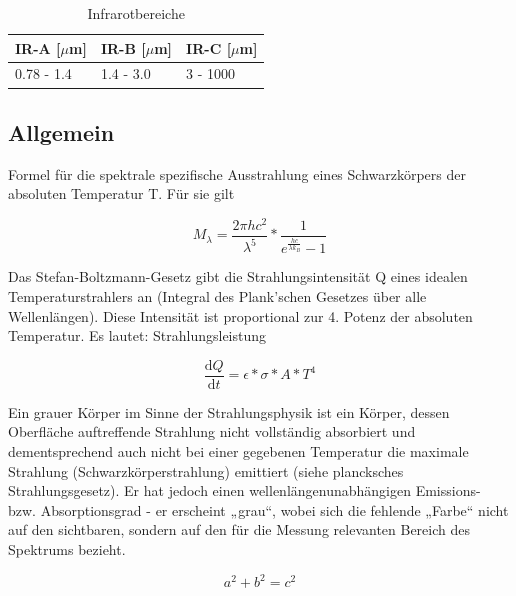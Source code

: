 \begin{table}[]
	\centering
	\label{my-label}
	\begin{tabular}{|l|l|l|}
		\hline
		\rowcolor{gray} IR-A {[}$\mu$m{]} & IR-B {[}$\mu$m{]} & IR-C {[}$\mu$m{]} \\ \hline
		0.78 - 1.4  & 1.4 - 3.0   & 3 - 1000    \\ \hline
	\end{tabular}
	\caption{Infrarotbereiche}
\end{table}

\subsection{Allgemein}

Formel für die spektrale spezifische Ausstrahlung  eines Schwarzkörpers der absoluten Temperatur  T. Für sie gilt

\begin{equation}
\label{eq5}
M_{\lambda } = \frac{2\pi h c^2 }{\lambda^5}*\frac{1}{e^\frac{hc}{\lambda k_{B}}-1}
\end{equation}

Das Stefan-Boltzmann-Gesetz gibt die Strahlungsintensität Q eines idealen Temperaturstrahlers an (Integral des Plank'schen Gesetzes über alle Wellenlängen). Diese Intensität ist proportional zur 4. Potenz der absoluten Temperatur. Es lautet:
Strahlungsleistung

\begin{equation}
\label{eq1}
\frac{\mathrm{d} Q}{\mathrm{d} t} = \epsilon *\sigma * A * T^4
\end{equation}






Ein grauer Körper im Sinne der Strahlungsphysik ist ein Körper, dessen Oberfläche auftreffende Strahlung nicht vollständig absorbiert und dementsprechend auch nicht bei einer gegebenen Temperatur die maximale Strahlung (Schwarzkörperstrahlung) emittiert (siehe plancksches Strahlungsgesetz). Er hat jedoch einen wellenlängenunabhängigen Emissions- bzw. Absorptionsgrad - er erscheint „grau“, wobei sich die fehlende „Farbe“ nicht auf den sichtbaren, sondern auf den für die Messung relevanten Bereich des Spektrums bezieht.

\begin{equation}
\label{eq2}
a^2+b^2=c^2
\end{equation}


